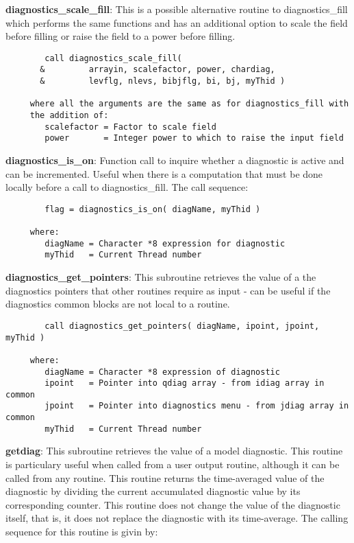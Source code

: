 \noindent
{\bf diagnostics\_scale\_fill}:  This is a possible alternative routine to
diagnostics\_fill which performs the same functions and has an additional option
to scale the field before filling or raise the field to a power before filling.

\begin{verbatim}
        call diagnostics_scale_fill(
       &         arrayin, scalefactor, power, chardiag,
       &         levflg, nlevs, bibjflg, bi, bj, myThid )

     where all the arguments are the same as for diagnostics_fill with 
     the addition of:
        scalefactor = Factor to scale field
        power       = Integer power to which to raise the input field
\end{verbatim}

\noindent
{\bf diagnostics\_is\_on}: Function call to inquire whether a
diagnostic is active and can be incremented. Useful when there is a
computation that must be done locally before a call to
diagnostics\_fill. The call sequence:

\begin{verbatim}
        flag = diagnostics_is_on( diagName, myThid )

     where:
        diagName = Character *8 expression for diagnostic
        myThid   = Current Thread number
\end{verbatim}

\noindent
{\bf diagnostics\_get\_pointers}: This subroutine retrieves the value
of a the diagnostics pointers that other routines require as input -
can be useful if the diagnostics common blocks are not local to a
routine.

\begin{verbatim}
        call diagnostics_get_pointers( diagName, ipoint, jpoint, myThid )

     where:
        diagName = Character *8 expression of diagnostic
        ipoint   = Pointer into qdiag array - from idiag array in common
        jpoint   = Pointer into diagnostics menu - from jdiag array in common
        myThid   = Current Thread number
\end{verbatim}

\noindent
{\bf getdiag}: This subroutine retrieves the value of a model
diagnostic.  This routine is particulary useful when called from a
user output routine, although it can be called from any routine.  This
routine returns the time-averaged value of the diagnostic by dividing
the current accumulated diagnostic value by its corresponding counter.
This routine does not change the value of the diagnostic itself, that
is, it does not replace the diagnostic with its time-average.  The
calling sequence for this routine is givin by:

